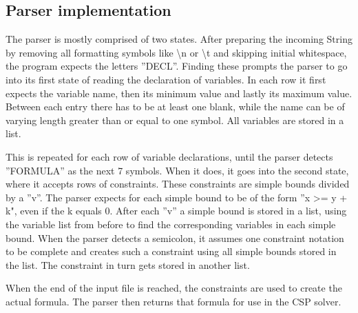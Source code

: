 
\subsection{Parser implementation}

The parser is mostly comprised of two states. After preparing the incoming String by removing all formatting symbols like \textbackslash n or \textbackslash t and skipping initial whitespace, the program expects the letters ''DECL''. Finding these prompts the parser to go into its first state of reading the declaration of variables. In each row it first expects the variable name, then its minimum value and lastly its maximum value. Between each entry there has to be at least one blank, while the name can be of varying length greater than or equal to one symbol. All variables are stored in a list.

This is repeated for each row of variable declarations, until the parser detects ''FORMULA'' as the next 7 symbols. When it does, it goes into the second state, where it accepts rows of constraints. These constraints are simple bounds divided by a ''v''. The parser expects for each simple bound to be of the form ''x >= y + k", even if the k equals 0. After each ''v'' a simple bound is stored in a list, using the variable list from before to find the corresponding variables in each simple bound. When the parser detects a semicolon, it assumes one constraint notation to be complete and creates such a constraint using all simple bounds stored in the list. The constraint in turn gets stored in another list.

When the end of the input file is reached, the constraints are used to create the actual formula.
The parser then returns that formula for use in the CSP solver.
